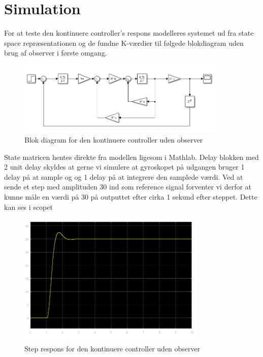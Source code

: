 \section{Simulation}
For at teste den kontinuere controller's respons modelleres systemet ud fra state space repræsentationen og de fundne K-værdier til følgede blokdiagram uden brug af observer i første omgang. 

\begin{figure}[H]
	\centering
	\includegraphics[width = 0.9\textwidth]{figur/Simulink_blokdiagram_1}
	\caption{Blok diagram for den kontinuere controller uden observer}
	\label{fig:Simulink_blokdiagram_1}
\end{figure}

State matricen hentes direkte fra modellen ligesom i Mathlab. Delay blokken med 2 unit delay skyldes at gerne vi simulere at gyroskopet på udgangen bruger 1 delay på at sample og og 1 delay på at integrere den samplede værdi.
Ved at sende et step med amplituden 30 ind som reference signal forventer vi derfor at kunne måle en værdi på 30 på outputtet efter cirka 1 sekund efter steppet. Dette kan ses i scopet 

\begin{figure}[H]
	\centering
	\includegraphics[width = 0.8\textwidth]{figur/Simulink_scope_1}
	\caption{Step respons for den kontinuere controller uden observer}
	\label{fig:Simulink_scope_1}
\end{figure}

